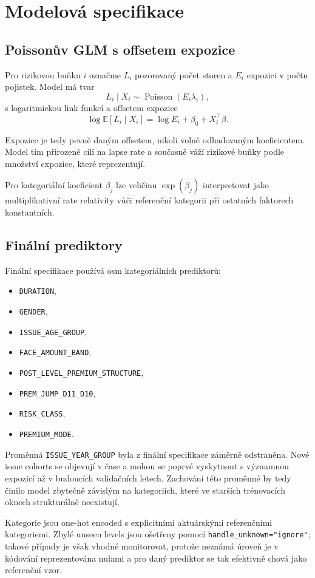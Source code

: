 \documentclass[11pt,a4paper]{article}
\theoremstyle{definition}
\newcommand{\E}{\mathbb{E}}
\begin{document}
\section{Modelová specifikace}
\subsection{Poissonův GLM s offsetem expozice}
Pro rizikovou buňku $i$ označme $L_i$ pozorovaný počet storen a $E_i$ expozici v počtu pojistek. Model má tvar
\[
L_i \mid X_i \sim \operatorname{Poisson}(E_i\lambda_i),
\]
s logaritmickou link funkcí a offsetem expozice
\[
\log \E[L_i\mid X_i] = \log E_i + \beta_0 + X_i^\top\beta.
\]

Expozice je tedy pevně daným offsetem, nikoli volně odhadovaným koeficientem. Model tím přirozeně cílí na lapse rate a současně váží rizikové buňky podle množství expozice, které reprezentují.

Pro kategoriální koeficient $\beta_j$ lze veličinu $\exp(\beta_j)$ interpretovat jako multiplikativní rate relativity vůči referenční kategorii při ostatních faktorech konstantních.

\subsection{Finální prediktory}
Finální specifikace používá osm kategoriálních prediktorů:
\begin{itemize}
\item \texttt{DURATION},
\item \texttt{GENDER},
\item \texttt{ISSUE\_AGE\_GROUP},
\item \texttt{FACE\_AMOUNT\_BAND},
\item \texttt{POST\_LEVEL\_PREMIUM\_STRUCTURE},
\item \texttt{PREM\_JUMP\_D11\_D10},
\item \texttt{RISK\_CLASS},
\item \texttt{PREMIUM\_MODE}.
\end{itemize}

Proměnná \texttt{ISSUE\_YEAR\_GROUP} byla z finální specifikace záměrně odstraněna. Nové issue cohorts se objevují v čase a mohou se poprvé vyskytnout s významnou expozicí až v budoucích validačních letech. Zachování této proměnné by tedy činilo model zbytečně závislým na kategoriích, které ve starších trénovacích oknech strukturálně neexistují.

Kategorie jsou one-hot encoded s explicitními aktuárskými referenčními kategoriemi. Zbylé unseen levels jsou ošetřeny pomocí \texttt{handle\_unknown="ignore"}; takové případy je však vhodné monitorovat, protože neznámá úroveň je v kódování reprezentována nulami a pro daný prediktor se tak efektivně chová jako referenční vzor.
\end{document}
